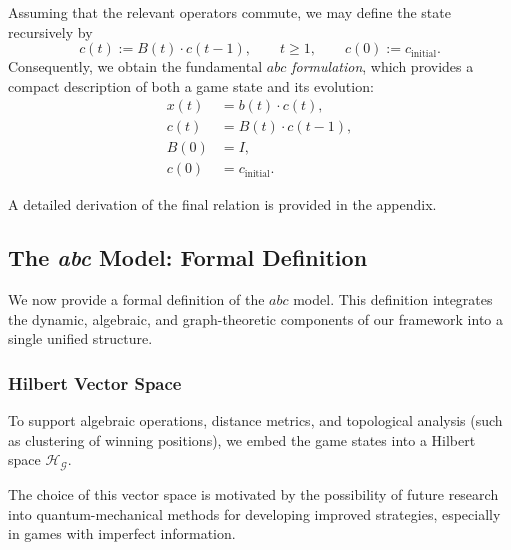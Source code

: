 \documentclass[11pt,a4paper]{article}
\theoremstyle{plain}
\theoremstyle{definition}
\begin{document}
Assuming that the relevant operators commute, we may define the state recursively by
\[
    c(t) := B(t)\cdot c(t-1),
    \qquad t \geq 1,
    \qquad c(0) := c_{\mathrm{initial}}.
\]
Consequently, we obtain the fundamental \emph{$abc$ formulation}, which provides a compact description of both a game state and its evolution:
\begin{equation}
    \boxed{
    \begin{aligned}
        x(t) &= b(t)\cdot c(t),\\
        c(t) &= B(t) \cdot c(t-1),\\
        B(0) &= I,\\
        c(0) &= c_{\mathrm{initial}}.
    \end{aligned}
    }
    \label{eq:abc_formulation}
\end{equation}

A detailed derivation of the final relation is provided in the appendix.

\vspace{0.5em}	

\subsection{The \emph{abc} Model: Formal Definition}
\label{sec:abc-formal}

\vspace{0.5em}	

We now provide a formal definition of the $abc$ model. This definition integrates the dynamic, algebraic, and graph-theoretic components of our framework into a single unified structure.

\subsubsection{Hilbert Vector Space}
\label{app:hilbert-space}

\vspace{0.5em}	

To support algebraic operations, distance metrics, and topological analysis (such as clustering of winning positions), we embed the game states into a Hilbert space $\mathcal{H}_\mathcal{G}$.

\vspace{0.5em}	

The choice of this vector space is motivated by the possibility of future research into quantum-mechanical methods for developing improved strategies, especially in games with imperfect information.
\end{document}

